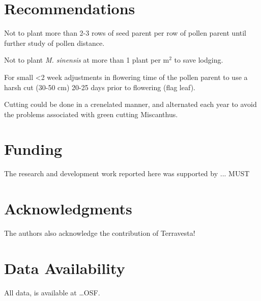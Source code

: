 \documentclass[fleqn, 15pt, lineno]{olplainarticle}
\begin{document}
\section{Recommendations}
Not to plant more than 2-3 rows of seed parent per row of pollen parent until further study of pollen distance.

Not to plant \textit{M. sinensis} at more than 1 plant per m$^2$ to save lodging.

For small <2 week adjustments in flowering time of the pollen parent to use a harsh cut (30-50 cm) 20-25 days prior to flowering (flag leaf).

Cutting could be done in a crenelated manner, and alternated each year to avoid the problems associated with green cutting Miscanthus.




\section{Funding}
The research and development work reported here was supported by ... MUST


\section{Acknowledgments}
The authors also acknowledge the contribution of Terravesta!

\section{Data Availability}
All data, is available at \dots OSF.


\end{document}

